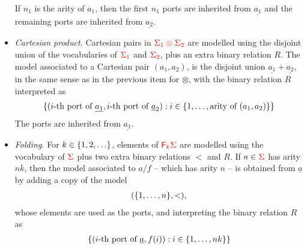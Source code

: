 \begin{definition}
\begin{itemize}
            If $n_1$ is the arity of $a_1$, then the first $n_1$ ports are inherited from  $\underline {a_1}$ and the remaining ports are inherited from  $\underline {a_2}$.
        \item \emph{Cartesian product.}   Cartesian pairs in  ${\color{red}{\Sigma_1 \otimes \Sigma_2}}$ are modelled  using the disjoint union of the vocabularies of ${\color{red}{\Sigma_1}}$ and ${\color{red}{\Sigma_2}}$, plus an extra binary relation $R$.  
            The model associated to a Cartesian pair   $ (a_1,a_2)$,  is      the disjoint union $\underline{a_1} +  \underline {a_2}$, in the same sense as in the previous item for $\otimes$,  with the binary relation $R$ interpreted as 
                \begin{align*}
                    \{(\text{$i$-th port of $\underline {a_1}$}, \text{$i$-th port of $\underline a_2$}): i \in \{1,\ldots,\text{arity of $(a_1,a_2)$}\}\} 
                \end{align*}
                The ports are inherited from   $\underline {a_1}$.
        \item \emph{Folding.}   For $k \in \{1,2,\ldots\}$, elements of   ${\color{red}{\mathsf F_{k}}}{\color{red}{\Sigma}}$ are modelled using the  vocabulary of ${\color{red}{\Sigma}}$ plus two extra binary relations $<$ and $R$. If $a \in {\color{red}{\Sigma}}$ has arity $nk$, then the model associated to $a/f$ -- which has arity $n$ --   is obtained from  $\underline{a}$ by adding a copy of the model
                \begin{align*}
                (\{1,\ldots,n\}, <),
                \end{align*}
        whose elements are used as the ports, and interpreting the binary relation $R$ as
        \begin{align*}
        \{(\text{$i$-th port of $\underline a$},f(i)) : i \in \{1,\ldots,nk\}\}
        \end{align*}
                

\end{itemize}
\end{definition}
